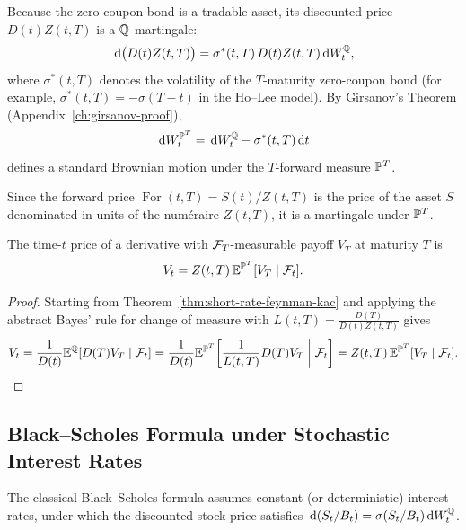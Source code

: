 Because the zero-coupon bond is a tradable asset, its discounted price $D(t) Z(t, T)$ is a $\mathbb{Q}$-martingale:
\[
\,\mathrm{d}\bigl(D(t) Z(t, T)\bigr) = \sigma^*(t, T)\,D(t) Z(t, T)\,\mathrm{d} W_t^{\mathbb{Q}},
\]
where $\sigma^*(t, T)$ denotes the volatility of the $T$-maturity zero-coupon bond (for example, $\sigma^*(t, T) = -\sigma(T - t)$ in the Ho--Lee model). By Girsanov's Theorem (Appendix~\ref{ch:girsanov-proof}),
\[
\,\mathrm{d} W_t^{\mathbb{P}^T} = \,\mathrm{d} W_t^{\mathbb{Q}} - \sigma^*(t, T)\,\mathrm{d} t
\]
defines a standard Brownian motion under the $T$-forward measure $\mathbb{P}^T$.

Since the forward price $\operatorname{For}(t, T) = S(t)/Z(t, T)$ is the price of the asset $S$ denominated in units of the num\'eraire $Z(t, T)$, it is a martingale under $\mathbb{P}^T$.

\begin{theorem}\label{thm:forward-measure-pricing}
    The time-$t$ price of a derivative with $\mathcal{F}_T$-measurable payoff $V_T$ at maturity $T$ is
    \[
    V_t = Z(t, T)\,\mathbb{E}^{\mathbb{P}^T}[V_T \mid \mathcal{F}_t].
    \]
\end{theorem}
\begin{proof}
    Starting from Theorem~\ref{thm:short-rate-feynman-kac} and applying the abstract Bayes' rule for change of measure with $L(t, T) = \frac{D(T)}{D(t)Z(t, T)}$ gives
    \[
    V_t = \frac{1}{D(t)}\mathbb{E}^{\mathbb{Q}}[D(T) V_T \mid \mathcal{F}_t] = \frac{1}{D(t)}\mathbb{E}^{\mathbb{P}^T}\!\left[\frac{1}{L(t, T)} D(T) V_T \;\middle|\; \mathcal{F}_t\right] = Z(t, T)\,\mathbb{E}^{\mathbb{P}^T}[V_T \mid \mathcal{F}_t].
    \]
\end{proof}

\subsection*{Black--Scholes Formula under Stochastic Interest Rates}
The classical Black--Scholes formula assumes constant (or deterministic) interest rates, under which the discounted stock price satisfies $\,\mathrm{d}(S_t / B_t) = \sigma(S_t / B_t)\,\mathrm{d} W_t^{\mathbb{Q}}$.

